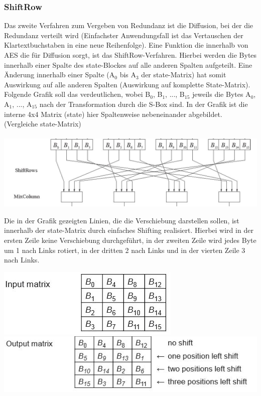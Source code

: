 \documentclass[10pt, a4paper,headsepline]{scrreprt}
\begin{document}
\subsubsection{ShiftRow}
Das zweite Verfahren zum Vergeben von Redundanz ist die Diffusion, bei der die Redundanz verteilt wird (Einfachster Anwendungsfall ist das Vertauschen der Klartextbuchstaben in eine neue Reihenfolge). Eine Funktion die innerhalb von AES die für Diffusion sorgt, ist das ShiftRow-Verfahren. Hierbei werden die Bytes innerhalb einer Spalte des state-Blockes auf alle anderen Spalten aufgeteilt. Eine Änderung innerhalb einer Spalte (A$_{0}$ bis A$_{3}$ der state-Matrix) hat somit Auswirkung auf alle anderen Spalten (Auswirkung auf komplette State-Matrix). Folgende Grafik soll das verdeutlichen, wobei B$_{0}$, B$_{1}$, ..., B$_{15}$ jeweils die Bytes A$_{0}$, A$_{1}$, ..., A$_{15}$ nach der Transformation durch die S-Box sind. In der Grafik ist die interne 4x4 Matrix (state) hier Spaltenweise nebeneinander abgebildet. (Vergleiche state-Matrix)  \\ \\%

\includegraphics[scale=0.5]{aes_Shift_Row.JPG} 
\hfill

Die in der Grafik gezeigten Linien, die die Verschiebung darstellen sollen, ist innerhalb der state-Matrix durch einfaches Shifting realisiert. Hierbei wird in der ersten Zeile keine Verschiebung durchgeführt, in der zweiten Zeile wird jedes Byte um 1 nach Links rotiert, in der dritten 2 nach Links und in der vierten Zeile 3 nach Links. 

\includegraphics[scale=0.5]{shift_row_before.JPG}
\includegraphics[scale=0.5]{shift_row_after.JPG} 
\hfill
\end{document}
